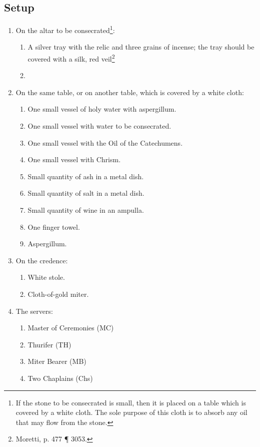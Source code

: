 \documentclass[twocolumn]{report}
\begin{document}
\subsection*{Setup} 
\begin{enumerate}
	\item On the altar to be consecrated\footnote{If the stone to be consecrated is small, then it is placed on a table which is covered by a white cloth. The sole purpose of this cloth is to absorb any oil that may flow from the stone.}:
	\begin{enumerate}
		\item A silver tray with the relic and three grains of incense; the tray should be covered with a silk, red veil\footnote{Moretti, p. 477 \P{} 3053.}
		\item 
	\end{enumerate}
	\item On the same table, or on another table, which is covered by a white cloth:
	\begin{enumerate}
		\item One small vessel of holy water with aspergillum.
		\item One small vessel with water to be consecrated.
		\item One small vessel with the Oil of the Catechumens.
		\item One small vessel with Chrism.
		\item Small quantity of ash in a metal dish.
		\item Small quantity of salt in a metal dish.
		\item Small quantity of wine in an ampulla.
		\item One finger towel.
		\item Aspergillum.
	\end{enumerate}
	\item On the credence:
	\begin{enumerate}
		\item White stole.
		\item Cloth-of-gold miter.
	\end{enumerate}
	\item The servers:
	\begin{enumerate}
		\item Master of Ceremonies (MC)
		\item Thurifer (TH)
		\item Miter Bearer (MB)
		\item Two Chaplains (Chs)
	\end{enumerate}
\end{enumerate}
\end{document}
